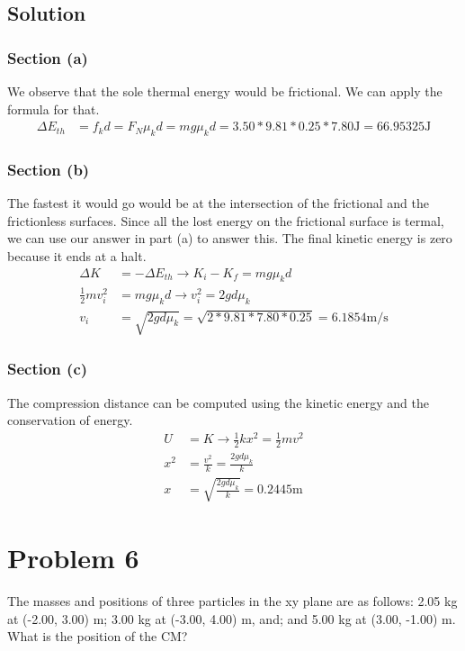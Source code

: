 \documentclass[12pt]{article}
\begin{document}
\subsection*{Solution}
\subsubsection*{Section (a)}
We observe that the sole thermal energy would be frictional. We can apply the formula for that.
\begin{align*}
    \Delta E_{th}   &=  f_k d
        =   F_N \mu_k d
        =   mg\mu_k d
        =   3.50*9.81*0.25*7.80 \unit{\joule}
        = \boxed{66.95325\unit{\joule}}
\end{align*}

\subsubsection*{Section (b)}
The fastest it would go would be at the intersection of the frictional and the frictionless surfaces. Since all the lost energy on the frictional surface is termal, we can use our answer in part (a) to answer this. The final kinetic energy is zero because it ends at a halt.
\begin{align*}
    \Delta K    &=  -\Delta E_{th}\rightarrow
    K_i - K_f   =  mg\mu_k d\\
    \frac{1}{2}mv_i^2   &=  mg\mu_k d\rightarrow
    v_i^2   =  2gd \mu_k\\
    v_i &=  \sqrt{2gd \mu_k}
        =   \sqrt{2*9.81*7.80*0.25}
        =   \boxed{6.1854\unit{\meter/\second}}
\end{align*}

\subsubsection*{Section (c)}
The compression distance can be computed using the kinetic energy and the conservation of energy.
\begin{align*}
    U   &=  K\rightarrow
    \frac{1}{2}kx^2 =  \frac{1}{2}mv^2\\
    x^2 &=  \frac{v^2}{k} 
        =   \frac{2gd \mu_k}{k}\\
    x   &=  \sqrt{\frac{2gd \mu_k}{k}}
        =   \boxed{0.2445\unit{\meter}}
\end{align*}

\pagebreak
\section*{Problem 6}
The masses and positions of three particles in the xy plane are as follows: 2.05 kg at (-2.00, 3.00) m; 3.00 kg at (-3.00, 4.00) m, and; and 5.00 kg at (3.00, -1.00) m. What is the position of the CM?
\end{document}
